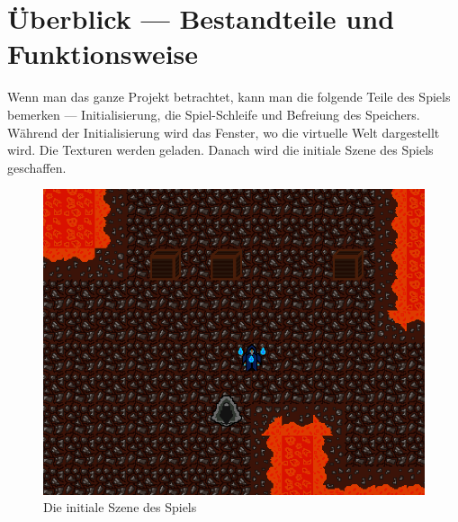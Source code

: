 \documentclass[
  10pt,
  a4paper,
  oneside,
  headers,
  headinclude,
  footinclude,
  BCOR5mm,
]{article}
\begin{document}
\section{Überblick --- Bestandteile und Funktionsweise}
Wenn man das ganze Projekt betrachtet, kann man die folgende Teile des Spiels
bemerken --- Initialisierung, die Spiel-Schleife und Befreiung des Speichers. \\
Während der Initialisierung wird das Fenster, wo die virtuelle Welt dargestellt
wird. Die Texturen werden geladen. Danach wird die initiale Szene des Spiels
geschaffen.

\begin{figure}[h]
  \centering
  \includegraphics[scale=0.25]{VirtualEnvironment}
  \caption{Die initiale Szene des Spiels}
  \label{fig:Umgebung}
\end{figure}
\end{document}
